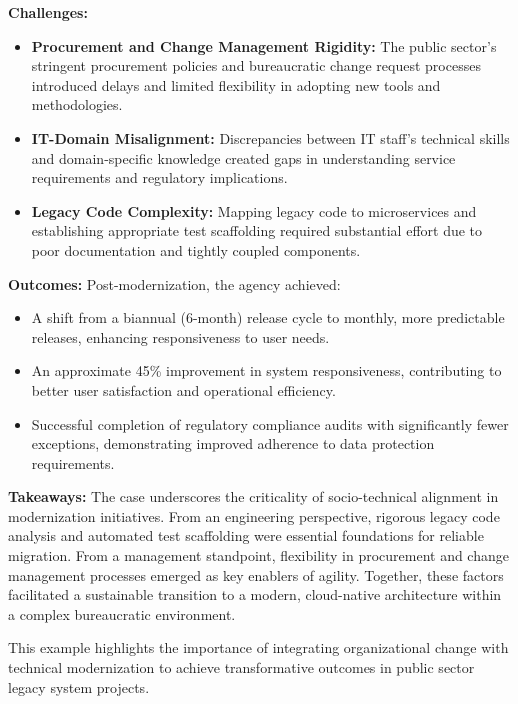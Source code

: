 \documentclass[12pt]{article}
\begin{document}
\textbf{Challenges:}  
\begin{itemize}
    \item \textbf{Procurement and Change Management Rigidity:} The public sector’s stringent procurement policies and bureaucratic change request processes introduced delays and limited flexibility in adopting new tools and methodologies.
    \item \textbf{IT-Domain Misalignment:} Discrepancies between IT staff’s technical skills and domain-specific knowledge created gaps in understanding service requirements and regulatory implications.
    \item \textbf{Legacy Code Complexity:} Mapping legacy code to microservices and establishing appropriate test scaffolding required substantial effort due to poor documentation and tightly coupled components.
\end{itemize}

\textbf{Outcomes:}  
Post-modernization, the agency achieved:

\begin{itemize}
    \item A shift from a biannual (6-month) release cycle to monthly, more predictable releases, enhancing responsiveness to user needs.
    \item An approximate 45\% improvement in system responsiveness, contributing to better user satisfaction and operational efficiency.
    \item Successful completion of regulatory compliance audits with significantly fewer exceptions, demonstrating improved adherence to data protection requirements.
\end{itemize}

\textbf{Takeaways:}  
The case underscores the criticality of socio-technical alignment in modernization initiatives. From an engineering perspective, rigorous legacy code analysis and automated test scaffolding were essential foundations for reliable migration. From a management standpoint, flexibility in procurement and change management processes emerged as key enablers of agility. Together, these factors facilitated a sustainable transition to a modern, cloud-native architecture within a complex bureaucratic environment.

This example highlights the importance of integrating organizational change with technical modernization to achieve transformative outcomes in public sector legacy system projects.


\vspace{0.5cm}
\end{document}
